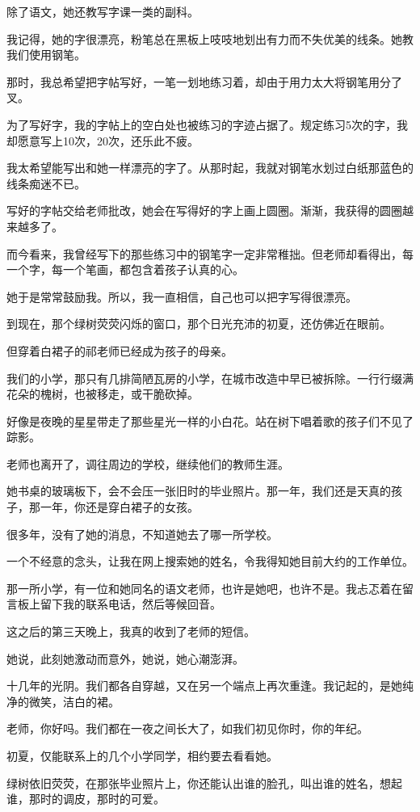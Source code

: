		除了语文，她还教写字课一类的副科。\par
		我记得，她的字很漂亮，粉笔总在黑板上吱吱地划出有力而不失优美的线条。她教我们使用钢笔。\par
		那时，我总希望把字帖写好，一笔一划地练习着，却由于用力太大将钢笔用分了叉。\par
		为了写好字，我的字帖上的空白处也被练习的字迹占据了。规定练习5次的字，我却愿意写上10次，20次，还乐此不疲。\par
		我太希望能写出和她一样漂亮的字了。从那时起，我就对钢笔水划过白纸那蓝色的线条痴迷不已。\par
		写好的字帖交给老师批改，她会在写得好的字上画上圆圈。渐渐，我获得的圆圈越来越多了。\par
		而今看来，我曾经写下的那些练习中的钢笔字一定非常稚拙。但老师却看得出，每一个字，每一个笔画，都包含着孩子认真的心。\par
		她于是常常鼓励我。所以，我一直相信，自己也可以把字写得很漂亮。

		到现在，那个绿树荧荧闪烁的窗口，那个日光充沛的初夏，还仿佛近在眼前。\par
		但穿着白裙子的祁老师已经成为孩子的母亲。\par
		我们的小学，那只有几排简陋瓦房的小学，在城市改造中早已被拆除。一行行缀满花朵的槐树，也被移走，或干脆砍掉。\par
		好像是夜晚的星星带走了那些星光一样的小白花。站在树下唱着歌的孩子们不见了踪影。\par
		老师也离开了，调往周边的学校，继续他们的教师生涯。\par
		她书桌的玻璃板下，会不会压一张旧时的毕业照片。那一年，我们还是天真的孩子，那一年，你还是穿白裙子的女孩。

		很多年，没有了她的消息，不知道她去了哪一所学校。

		一个不经意的念头，让我在网上搜索她的姓名，令我得知她目前大约的工作单位。\par
		那一所小学，有一位和她同名的语文老师，也许是她吧，也许不是。我忐忑着在留言板上留下我的联系电话，然后等候回音。\par
		这之后的第三天晚上，我真的收到了老师的短信。

		她说，此刻她激动而意外，她说，她心潮澎湃。

		十几年的光阴。我们都各自穿越，又在另一个端点上再次重逢。我记起的，是她纯净的微笑，洁白的裙。

		老师，你好吗。我们都在一夜之间长大了，如我们初见你时，你的年纪。\par
		初夏，仅能联系上的几个小学同学，相约要去看看她。\par
		绿树依旧荧荧，在那张毕业照片上，你还能认出谁的脸孔，叫出谁的姓名，想起谁，那时的调皮，那时的可爱。

